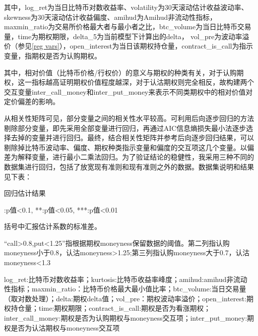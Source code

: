     \newpage
\restoregeometry
其中，log\_ret为当日比特币对数收益率、volatility为30天滚动估计收益波动率、skewness为30天滚动估计收益偏度、amihud为Amihud非流动性指标，maxmin\_ratio为交易所价格最大者与最小者之比，btc\_volume为当日比特币交易量，time为期权期限，delta\_5为当前模型下计算出的delta，
vol\_pre为波动率溢价（参见\ref{reg vars}），open\_interest为当日该期权持仓量，contract\_is\_call为指示变量，指期权是否为认购期权。
\par{其中，相对价值（比特币价格/行权价）的意义与期权的种类有关，对于认购期权，这一指标越高证明期权价值程度越深，对于认沽期权则完全相反，故构建两个交互变量inter\_call\_money和inter\_put\_money来表示不同类期权中的相对价值对定价偏差的影响。}
\par{从相关性矩阵可见，部分变量之间的相关性水平较高。可利用后向逐步回归的方法剔除部分变量，即先采用全部变量进行回归，再通过AIC信息熵损失最小法逐步选择去掉的变量并进行回归。最终，结合相关性矩阵并参考后向逐步回归结果，可以剔除掉比特币波动率、偏度、期权种类指示变量和偏度的交互项这几个变量。以偏差为解释变量，进行最小二乘法回归。为了验证结论的稳健性，我采用三种不同的数据集进行回归，包括了放宽现有准则和现有准则之外的数据。数据集说明和结果见下表：}
\newpage
{}
\begin{center}
    \begin{threeparttable}[H]

        \caption{回归估计结果}
        \label{reg_table}
        
        
        \begin{tablenotes}
            \footnotesize
            \item *:p值<0.1, **:p值<0.05, ***:p值<0.01
            \item 括号中汇报估计系数的标准差。
            \item “call>0.8,put<1.25”指根据期权moneyness保留数据的阈值。第二列指认购moneyness小于0.8，认沽moneyness>1.25;第三列指认购moneyness大于0.7，认沽moneyness<1.3
            \item log\_ret:比特币对数收益率；kurtosis:比特币收益率峰度；amihud:amihud非流动性指标；maxmin\_ratio：比特币价格最大最小值比率；btc\_volume:当日交易量（取对数处理）；delta:期权delta值；vol\_pre：期权波动率溢价；open\_interest:期权持仓量；time:期权期限；contract\_is\_call:期权是否为看涨期权；inter\_call\_money:期权是否为认购期权与moneyness交互项；inter\_put\_money:期权是否为认沽期权与moneyness交互项
        \end{tablenotes}
    \end{threeparttable}
\end{center}

